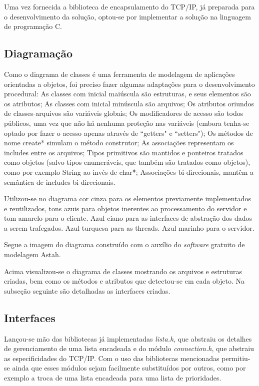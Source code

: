 \documentclass[12pt]{article}
\begin{document}
Uma vez fornecida a biblioteca de encapsulamento do TCP/IP, já preparada para o desenvolvimento da solução, optou-se por implementar a solução na linguagem de programação C.

\subsection{Diagramação}\label{sec:diagramacao}

Como o diagrama de classes é uma ferramenta de modelagem de aplicações orientadas a objetos, foi preciso fazer algumas adaptações para o desenvolvimento procedural:
As classes com inicial maiúscula são estruturas, e seus elementos são os atributos;
As classes com inicial minúscula são arquivos;
Os atributos oriundos de classes-arquivos são variáveis globais;
Os modificadores de acesso são todos públicos, uma vez que não há nenhuma proteção nas variáveis (embora tenha-se optado por fazer o acesso apenas através de ``getters" e ``setters"); Os métodos de nome create* simulam o método construtor;
As associações representam os includes entre os arquivos;
Tipos primitivos são mantidos e ponteiros tratados como objetos (salvo tipos enumeráveis, que também são tratados como objetos), como por exemplo String ao invés de char*;
Associações bi-direcionais, mantêm a semântica de includes bi-direcionais.

Utilizou-se no diagrama cor cinza para os elementos previamente implementados e reutilizados, tons azuis para objetos inerentes ao processamento do servidor e tom amarelo para o cliente. Azul ciano para as interfaces de abstração dos dados a serem trafegados. Azul turquesa para as threads. Azul marinho para o servidor.

Segue a imagem do diagrama construído com o auxílio do \textit{software} gratuito de modelagem Astah.


Acima visualizou-se o diagrama de classes mostrando os arquivos e estruturas criadas, bem como os métodos e atributos que detectou-se em cada objeto. Na subseção seguinte são detalhadas as interfaces criadas.

\subsection{Interfaces}

Lançou-se mão das bibliotecas já implementadas \emph{lista.h}, que abstraiu os detalhes de gerenciamento de uma lista encadeada e do módulo \emph{connection.h}, que abstraiu as especificidades do TCP/IP. Com o uso das bibliotecas mencionadas permitiu-se ainda que esses módulos sejam facilmente substituídos por outros, como por exemplo a troca de uma lista encadeada para uma lista de prioridades.
\end{document}
